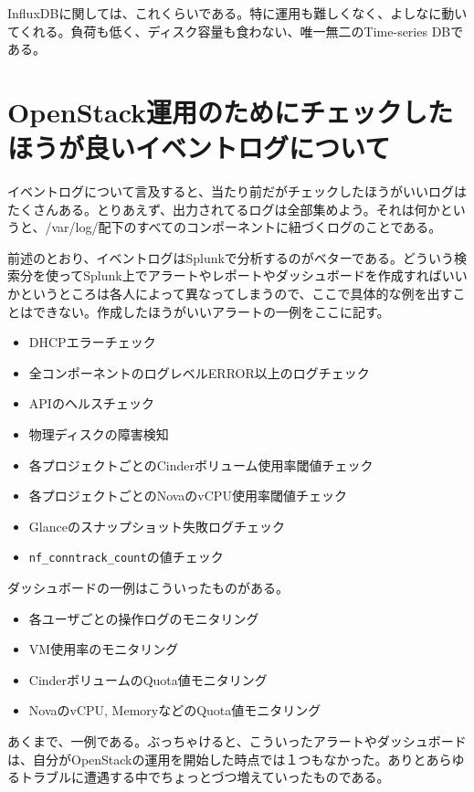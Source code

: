 InfluxDBに関しては、これくらいである。特に運用も難しくなく、よしなに動いてくれる。負荷も低く、ディスク容量も食わない、唯一無二のTime-series DBである。

\section{OpenStack運用のためにチェックしたほうが良いイベントログについて}
イベントログについて言及すると、当たり前だがチェックしたほうがいいログはたくさんある。とりあえず、出力されてるログは全部集めよう。それは何かというと、/var/log/配下のすべてのコンポーネントに紐づくログのことである。

前述のとおり、イベントログはSplunkで分析するのがベターである。どういう検索分を使ってSplunk上でアラートやレポートやダッシュボードを作成すればいいかというところは各人によって異なってしまうので、ここで具体的な例を出すことはできない。作成したほうがいいアラートの一例をここに記す。

\begin{itemize}
	\item DHCPエラーチェック
	\item 全コンポーネントのログレベルERROR以上のログチェック
	\item APIのヘルスチェック
	\item 物理ディスクの障害検知
	\item 各プロジェクトごとのCinderボリューム使用率閾値チェック
	\item 各プロジェクトごとのNovaのvCPU使用率閾値チェック
	\item Glanceのスナップショット失敗ログチェック
	\item \verb|nf_conntrack_count|の値チェック
\end{itemize}

ダッシュボードの一例はこういったものがある。

\begin{itemize}
	\item 各ユーザごとの操作ログのモニタリング
	\item VM使用率のモニタリング
	\item CinderボリュームのQuota値モニタリング
	\item NovaのvCPU, MemoryなどのQuota値モニタリング
\end{itemize}

あくまで、一例である。ぶっちゃけると、こういったアラートやダッシュボードは、自分がOpenStackの運用を開始した時点では１つもなかった。ありとあらゆるトラブルに遭遇する中でちょっとづつ増えていったものである。

